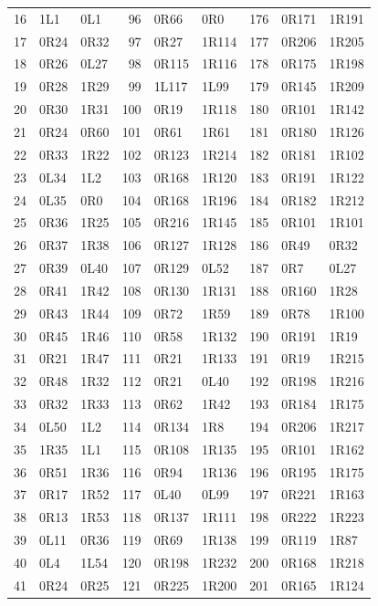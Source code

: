 \begin{longtable}{rll@{\hspace{1.3em}}rll@{\hspace{1.3em}}rll}
16 & 1L1 & 0L1 & 96 & 0R66 & 0R0 & 176 & 0R171 & 1R191 \\
17 & 0R24 & 0R32 & 97 & 0R27 & 1R114 & 177 & 0R206 & 1R205 \\
18 & 0R26 & 0L27 & 98 & 0R115 & 1R116 & 178 & 0R175 & 1R198 \\
19 & 0R28 & 1R29 & 99 & 1L117 & 1L99 & 179 & 0R145 & 1R209 \\
20 & 0R30 & 1R31 & 100 & 0R19 & 1R118 & 180 & 0R101 & 1R142 \\
21 & 0R24 & 0R60 & 101 & 0R61 & 1R61 & 181 & 0R180 & 1R126 \\
22 & 0R33 & 1R22 & 102 & 0R123 & 1R214 & 182 & 0R181 & 1R102 \\
23 & 0L34 & 1L2 & 103 & 0R168 & 1R120 & 183 & 0R191 & 1R122 \\
24 & 0L35 & 0R0 & 104 & 0R168 & 1R196 & 184 & 0R182 & 1R212 \\
25 & 0R36 & 1R25 & 105 & 0R216 & 1R145 & 185 & 0R101 & 1R101 \\
26 & 0R37 & 1R38 & 106 & 0R127 & 1R128 & 186 & 0R49 & 0R32 \\
27 & 0R39 & 0L40 & 107 & 0R129 & 0L52 & 187 & 0R7 & 0L27 \\
28 & 0R41 & 1R42 & 108 & 0R130 & 1R131 & 188 & 0R160 & 1R28 \\
29 & 0R43 & 1R44 & 109 & 0R72 & 1R59 & 189 & 0R78 & 1R100 \\
30 & 0R45 & 1R46 & 110 & 0R58 & 1R132 & 190 & 0R191 & 1R19 \\
31 & 0R21 & 1R47 & 111 & 0R21 & 1R133 & 191 & 0R19 & 1R215 \\
32 & 0R48 & 1R32 & 112 & 0R21 & 0L40 & 192 & 0R198 & 1R216 \\
33 & 0R32 & 1R33 & 113 & 0R62 & 1R42 & 193 & 0R184 & 1R175 \\
34 & 0L50 & 1L2 & 114 & 0R134 & 1R8 & 194 & 0R206 & 1R217 \\
35 & 1R35 & 1L1 & 115 & 0R108 & 1R135 & 195 & 0R101 & 1R162 \\
36 & 0R51 & 1R36 & 116 & 0R94 & 1R136 & 196 & 0R195 & 1R175 \\
37 & 0R17 & 1R52 & 117 & 0L40 & 0L99 & 197 & 0R221 & 1R163 \\
38 & 0R13 & 1R53 & 118 & 0R137 & 1R111 & 198 & 0R222 & 1R223 \\
39 & 0L11 & 0R36 & 119 & 0R69 & 1R138 & 199 & 0R119 & 1R87 \\
40 & 0L4 & 1L54 & 120 & 0R198 & 1R232 & 200 & 0R168 & 1R218 \\
41 & 0R24 & 0R25 & 121 & 0R225 & 1R200 & 201 & 0R165 & 1R124 \\

\end{longtable}
